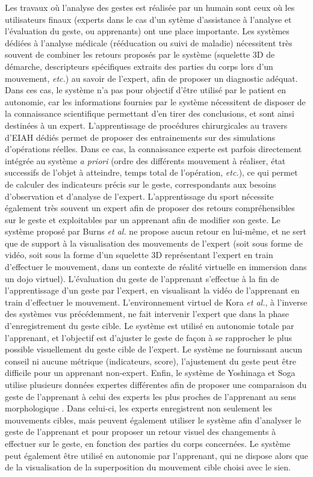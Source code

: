 Les travaux où l'analyse des gestes est réalisée par un humain sont ceux où les utilisateurs finaux (experts dans le cas d'un sytème d'assistance à l'analyse et l'évaluation du geste, ou apprenants) ont une place importante. Les systèmes dédiées à l'analyse médicale (rééducation ou suivi de maladie) nécessitent très souvent de combiner les retours proposés par le système (squelette 3D de démarche, descripteurs spécifiques extraits des parties du corps lors d'un mouvement, \textit{etc.}) au savoir de l'expert, afin de proposer un diagnostic adéquat. Dans ces cas, le système n'a pas pour objectif d'être utilisé par le patient en autonomie, car les informations fournies par le système nécessitent de disposer de la connaissance scientifique permettant d'en tirer des conclusions, et sont ainsi destinées à un expert. L'apprentissage de procédures chirurgicales au travers d'EIAH dédiés permet de proposer des entrainements sur des simulations d'opérations réelles. Dans ce cas, la connaissance experte est parfois directement intégrée au système \textit{a priori} (ordre des différents mouvement à réaliser, état successifs de l'objet à atteindre, temps total de l'opération, \textit{etc.}), ce qui permet de calculer des indicateurs précis sur le geste, correspondants aux besoins d'observation et d'analyse de l'expert. L'apprentissage du sport nécessite également très souvent un expert afin de proposer des retours compréhensibles sur le geste et exploitables par un apprenant afin de modifier son geste. Le système proposé par Burns \textit{et al.} ne propose aucun retour en lui-même, et ne sert que de support à la visualisation des mouvements de l'expert (soit sous forme de vidéo, soit sous la forme d'un squelette 3D représentant l'expert en train d'effectuer le mouvement, dans un contexte de réalité virtuelle en immersion dans un dojo virtuel). L'évaluation du geste de l'apprenant s'effectue à la fin de l'apprentissage d'un geste par l'expert, en visualisant la vidéo de l'apprenant en train d'effectuer le mouvement. L'environnement virtuel de Kora \textit{et al.}, à l'inverse des systèmes vus précédemment, ne fait intervenir l'expert que dans la phase d'enregistrement du geste cible. Le système est utilisé en autonomie totale par l'apprenant, et l'objectif est d'ajuster le geste de façon à se rapprocher le plus possible visuellement du geste cible de l'expert. Le système ne fournissant aucun conseil ni aucune métrique (indicateurs, score), l'ajustement du geste peut être difficile pour un apprenant non-expert. Enfin, le système de Yoshinaga et Soga utilise plusieurs données expertes différentes afin de proposer une comparaison du geste de l'apprenant à celui des experts les plus proches de l'apprenant au sens morphologique \parencite{Yoshinaga2015Doa}. Dans celui-ci, les experts enregistrent non seulement les mouvements cibles, mais peuvent également utiliser le système afin d'analyser le geste de l'apprenant et pour proposer un retour visuel des changements à effectuer sur le geste, en fonction des parties du corps concernées. Le système peut également être utilisé en autonomie par l'apprenant, qui ne dispose alors que de la visualisation de la superposition du mouvement cible choisi avec le sien.

